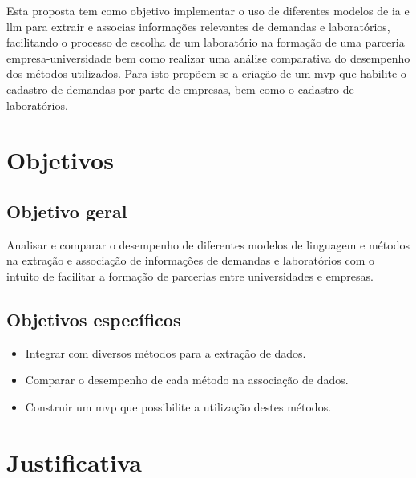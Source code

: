 Esta proposta tem como objetivo implementar o uso de diferentes modelos de  \gls{ia} e \gls{llm} para extrair e associas informações relevantes de demandas e laboratórios, facilitando o processo de escolha de um laboratório na formação de uma parceria empresa-universidade bem como realizar uma análise comparativa do desempenho dos métodos utilizados. Para isto propõem-se a criação de um \gls{mvp} que habilite o cadastro de demandas por parte de empresas, bem como o cadastro de laboratórios.

\section{Objetivos}\label{sec:objetivos}

\subsection{Objetivo geral}\label{subsec:objetivoGeral}

Analisar e comparar o desempenho de diferentes modelos de linguagem e métodos na extração e associação de informações de demandas e laboratórios com o intuito de facilitar a formação de parcerias entre universidades e empresas.

\subsection{Objetivos específicos}\label{subsec:objetivosEspecificos}

\begin{itemize}
    \item Integrar com diversos métodos para a extração de dados.
    \item Comparar o desempenho de cada método na associação de dados.
    \item Construir um \gls{mvp} que possibilite a utilização destes métodos.
\end{itemize}

\section{Justificativa}\label{sec:justificativa}

